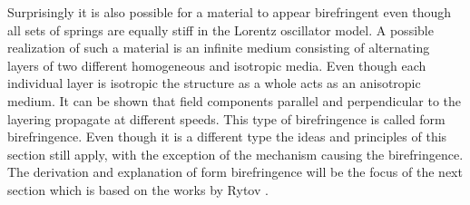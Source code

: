 Surprisingly it is also possible for a material to appear birefringent even though all sets of springs are equally stiff in the Lorentz oscillator model. A possible realization of such a material is an infinite medium consisting of alternating layers of two different homogeneous and isotropic media. Even though each individual layer is isotropic the structure as a whole acts as an anisotropic medium. It can be shown that field components parallel and perpendicular to the layering propagate at different speeds. This type of birefringence is called form birefringence. Even though it is a different type the ideas and principles of this section still apply, with the exception of the mechanism causing the birefringence. The derivation and explanation of form birefringence will be the focus of the next section which is based on the works by Rytov \cite{Rytov1956}. 

